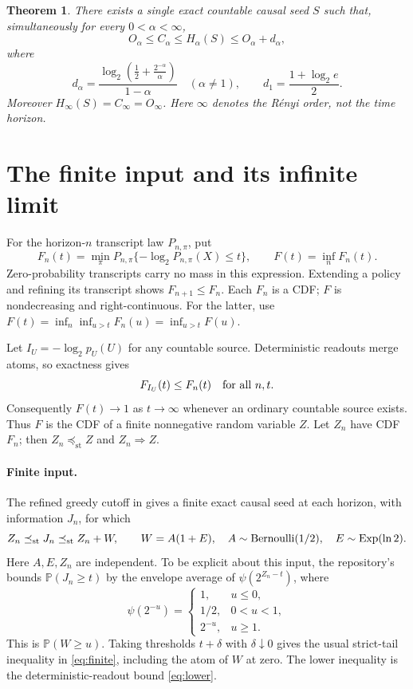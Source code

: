 \documentclass[11pt,a4paper]{article}
\newtheorem{theorem}{Theorem}
\newcommand{\Pp}{\mathbb P}
\newcommand{\st}{\preceq_{\mathrm{st}}}
\begin{document}
\begin{theorem}\label{thm:main}
There exists a single exact countable causal seed $S$ such that, simultaneously
for every $0<\alpha<\infty$,
\[
 \boxed{O_\alpha\le C_\alpha\le H_\alpha(S)\le O_\alpha+d_\alpha,}
\]
where
\[
 d_\alpha=\frac{\log_2\!\left(\frac12+\frac{2^{-\alpha}}{\alpha}\right)}
 {1-\alpha}\quad(\alpha\ne1),\qquad
 d_1=\frac{1+\log_2 e}{2}.
\]
Moreover $H_\infty(S)=C_\infty=O_\infty$.
Here $\infty$ denotes the R\'enyi order, not the time horizon.
\end{theorem}

\section{The finite input and its infinite limit}
For the horizon-$n$ transcript law $P_{n,\pi}$, put
\[
 F_n(t)=\min_\pi P_{n,\pi}\{-\log_2P_{n,\pi}(X)\le t\},
 \qquad F(t)=\inf_nF_n(t).
\]
Zero-probability transcripts carry no mass in this expression.
Extending a policy and refining its transcript shows $F_{n+1}\le F_n$.
Each $F_n$ is a CDF; $F$ is nondecreasing and right-continuous. For the latter,
use $F(t)=\inf_n\inf_{u>t}F_n(u)=\inf_{u>t}F(u)$.

Let $I_U=-\log_2 p_U(U)$ for any countable source.
Deterministic readouts merge atoms, so exactness gives
\begin{equation}\label{eq:lower}
 F_{I_U}(t)\le F_n(t)\quad\hbox{for all }n,t.
\end{equation}
Consequently $F(t)\to1$ as $t\to\infty$ whenever an ordinary countable source
exists. Thus $F$ is the CDF of a finite nonnegative random variable $Z$.
Let $Z_n$ have CDF $F_n$; then $Z_n\st Z$ and $Z_n\Rightarrow Z$.

\paragraph{Finite input.}
The refined greedy cutoff in \cite{repo} gives a finite exact causal seed
at each horizon, with information $J_n$, for which
\begin{equation}\label{eq:finite}
 Z_n\st J_n\st Z_n+W,
 \qquad
 W=A(1+E),\quad A\sim{\rm Bernoulli}(1/2),\quad
 E\sim{\rm Exp}(\ln2).
\end{equation}
Here $A,E,Z_n$ are independent. To be explicit about this input, the
repository's  bounds
$\Pp(J_n\ge t)$ by the envelope average of
$\psi(2^{Z_n-t})$, where
\[
 \psi(2^{-u})=
 \begin{cases}
 1,&u\le0,\\
 1/2,&0<u<1,\\
 2^{-u},&u\ge1.
 \end{cases}
\]
This is $\Pp(W\ge u)$. Taking thresholds $t+\delta$ with $\delta\downarrow0$
gives the usual strict-tail inequality in \eqref{eq:finite}, including the
atom of $W$ at zero. The lower inequality is the deterministic-readout
bound \eqref{eq:lower}.
\end{document}
